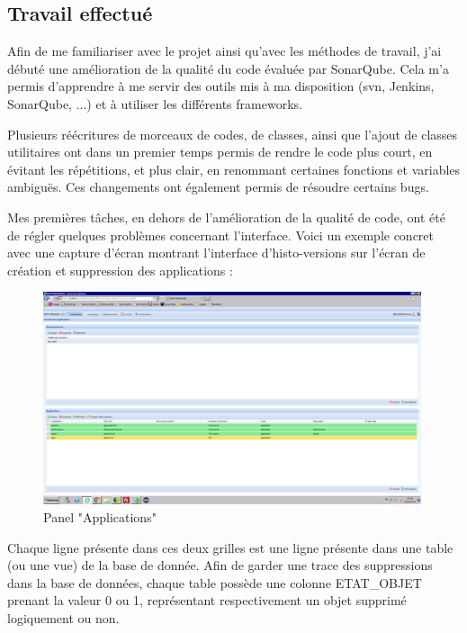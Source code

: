\documentclass[12pt]{report}
\begin{document}
    \newpage
    
    \subsection{Travail effectué}
    
    Afin de me familiariser avec le projet ainsi qu'avec les méthodes de travail, j'ai débuté une amélioration de la qualité du code évaluée par SonarQube. Cela m'a permis d'apprendre à me servir des outils mis à ma disposition (svn, Jenkins, SonarQube, ...) et à utiliser les différents frameworks.
    
    Plusieurs réécritures de morceaux de codes, de classes, ainsi que l'ajout de classes utilitaires ont dans un premier temps permis de rendre le code plus court, en évitant les répétitions, et plus clair, en renommant certaines fonctions et variables ambiguës. Ces changements ont également permis de résoudre certains bugs.
    
    Mes premières tâches, en dehors de l'amélioration de la qualité de code, ont été de régler quelques problèmes concernant l'interface.
    Voici un exemple concret avec une capture d'écran montrant l'interface d'histo-versions sur l'écran de création et suppression des applications :
    \begin{figure}[ht]
        \centering
        \includegraphics[width=0.99\textwidth]{img/HV_Panel_applications.png}
        \caption{Panel "Applications"}
        \label{fig:histoversions_applications}
    \end{figure}
    
    Chaque ligne présente dans ces deux grilles est une ligne présente dans une table (ou une vue) de la base de donnée. Afin de garder une trace des suppressions dans la base de données, chaque table possède une colonne ETAT\_OBJET prenant la valeur 0 ou 1, représentant respectivement un objet supprimé logiquement ou non.
    
\end{document}
